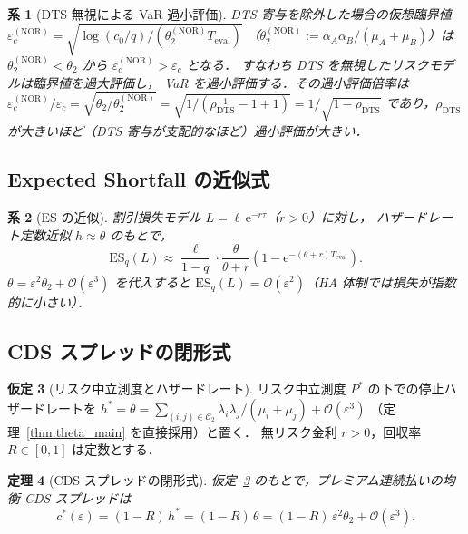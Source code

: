 \documentclass[12pt,a4paper]{article}
\theoremstyle{plain}
\newtheorem{theorem}{定理}[section]
\newtheorem{corollary}[theorem]{系}
\theoremstyle{definition}
\newtheorem{assumption}[theorem]{仮定}
\theoremstyle{remark}
\newcommand{\calO}{\mathcal{O}}        %
\newcommand{\eps}{\varepsilon}         %
\newcommand{\e}{\mathrm{e}}            %
\newcommand{\ES}{\mathrm{ES}}
\newcommand{\calCtwo}{\mathcal{C}_2}   %
\newcommand{\rhoDTS}{\rho_{\mathrm{DTS}}}
\begin{document}
\begin{corollary}[DTS 無視による VaR 過小評価]\label{cor:VaR_DTS}
  DTS 寄与を除外した場合の仮想臨界値
  $\eps_c^{(\mathrm{NOR})} = \sqrt{\log(c_0/q)/(\theta_2^{(\mathrm{NOR})}T_{\mathrm{eval}})}$
  （$\theta_2^{(\mathrm{NOR})}:= \alpha_A\alpha_B/(\mu_A+\mu_B)$）は
  $\theta_2^{(\mathrm{NOR})} < \theta_2$ から
  $\eps_c^{(\mathrm{NOR})} > \eps_c$ となる．
  すなわち DTS を無視したリスクモデルは臨界値を過大評価し，
  VaR を過小評価する．その過小評価倍率は
  $\eps_c^{(\mathrm{NOR})}/\eps_c = \sqrt{\theta_2/\theta_2^{(\mathrm{NOR})}}
  = \sqrt{1/(\rhoDTS^{-1}-1+1)} = 1/\sqrt{1-\rhoDTS}$
  であり，$\rhoDTS$ が大きいほど（DTS 寄与が支配的なほど）過小評価が大きい．
\end{corollary}

\subsection{Expected Shortfall の近似式}

\begin{corollary}[ES の近似]\label{cor:ES}
  割引損失モデル $L=\ell\,\e^{-r\tau}$（$r>0$）に対し，
  ハザードレート定数近似 $h\approx\theta$ のもとで，
  \begin{equation}\label{eq:ES}
    \ES_q(L)
    \approx \frac{\ell}{1-q}\cdot
    \frac{\theta}{\theta+r}\left(1-\e^{-(\theta+r)T_{\mathrm{eval}}}\right).
  \end{equation}
  $\theta = \eps^2\theta_2 + \calO(\eps^3)$ を代入すると
  $\ES_q(L) = \calO(\eps^2)$（HA 体制では損失が指数的に小さい）．
\end{corollary}

\subsection{CDS スプレッドの閉形式}

\begin{assumption}[リスク中立測度とハザードレート]\label{ass:RN}
  リスク中立測度 $P^*$ の下での停止ハザードレートを
  $h^* = \theta = \sum_{(i,j)\in\calCtwo}\lambda_i\lambda_j/(\mu_i+\mu_j)+\calO(\eps^3)$
  （定理~\ref{thm:theta_main} を直接採用）と置く．
  無リスク金利 $r>0$，回収率 $R\in[0,1]$ は定数とする．
\end{assumption}

\begin{theorem}[CDS スプレッドの閉形式]\label{thm:CDS}
  仮定~\ref{ass:RN} のもとで，プレミアム連続払いの均衡 CDS スプレッドは
  \begin{equation}\label{eq:CDS}
    c^*(\eps)
    = (1-R)\,h^*
    = (1-R)\,\theta
    = (1-R)\,\eps^2\theta_2 + \calO(\eps^3).
  \end{equation}
\end{theorem}
\end{document}
